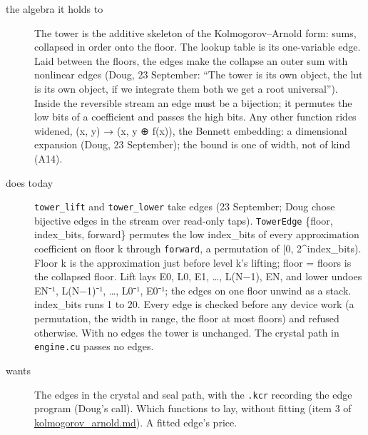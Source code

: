 \begin{description}
\item[{the algebra it holds to}] The tower is the additive skeleton of the Kolmogorov–Arnold form: sums, collapsed in order onto the floor. The lookup table is its one-variable edge. Laid between the floors, the edges make the collapse an outer sum with nonlinear edges (Doug, 23 September: “The tower is its own object, the lut is its own object, if we integrate them both we get a root universal”). Inside the reversible stream an edge must be a bijection; it permutes the low bits of a coefficient and passes the high bits. Any other function rides widened, (x, y) → (x, y ⊕ f(x)), the Bennett embedding: a dimensional expansion (Doug, 23 September); the bound is one of width, not of kind (A14).
\item[{does today}] \texttt{tower\_\allowbreak{}lift} and \texttt{tower\_\allowbreak{}lower} take edges (23 September; Doug chose bijective edges in the stream over read-only taps). \texttt{Tower\allowbreak{}Edge} \{floor, index\_\allowbreak{}bits, forward\} permutes the low index\_\allowbreak{}bits of every approximation coefficient on floor k through \texttt{forward}, a permutation of [0, 2\textasciicircum{}index\_\allowbreak{}bits). Floor k is the approximation just before level k's lifting; floor = floors is the collapsed floor. Lift lays E0, L0, E1, …, L(N−1), EN, and lower undoes EN⁻¹, L(N−1)⁻¹, …, L0⁻¹, E0⁻¹; the edges on one floor unwind as a stack. index\_\allowbreak{}bits runs 1 to 20. Every edge is checked before any device work (a permutation, the width in range, the floor at most floors) and refused otherwise. With no edges the tower is unchanged. The crystal path in \texttt{engine.\allowbreak{}cu} passes no edges.
\item[{wants}] The edges in the crystal and seal path, with the \texttt{.\allowbreak{}kcr} recording the edge program (Doug's call). Which functions to lay, without fitting (item 3 of \hyperref[chap:kolmogorov-arnold]{kolmogorov\_\allowbreak{}arnold.md}). A fitted edge's price.

\end{description}
